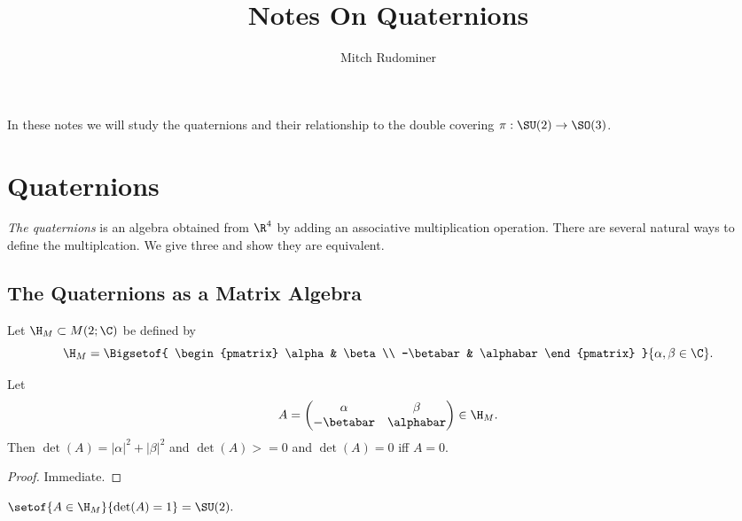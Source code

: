 \documentclass[oneside,12pt]{amsart}
\begin{document}
\title{Notes On Quaternions}
\author{Mitch Rudominer}

\maketitle

\tableofcontents

In these notes we will study the quaternions and their relationship to the double covering $\pi:\SU(2)\to \SO(3)$.

\section{Quaternions}
\emph{The quaternions} is an algebra obtained from $\R^4$ by adding an associative multiplication operation. There are several natural ways to define the multiplcation. We give three and show they are equivalent.

\subsection{The Quaternions as a Matrix Algebra}

\begin{definition}
Let $\H_M \subset M(2; \C)$ be defined by 
$$
\H_M = \Bigsetof{ \begin{pmatrix}
\alpha & \beta \\
-\betabar & \alphabar
\end{pmatrix} 
}{\alpha,\beta \in \C}.
$$
\end{definition}

\begin{lemma}
\label{lemma:det_of_A}
Let
$$A= \begin{pmatrix}
\alpha & \beta \\
-\betabar & \alphabar
\end{pmatrix}
\in\H_M.$$
Then $\det(A) = |\alpha|^2 + |\beta|^2$ and $\det(A)>=0$ and $\det(A)=0$ iff $A=0$.
\end{lemma} 
\begin{proof}
Immediate.
\end{proof}


\begin{note}
$\setof{A\in \H_M}{\det(A) = 1} = \SU(2).$
\end{note}
\end{document}
